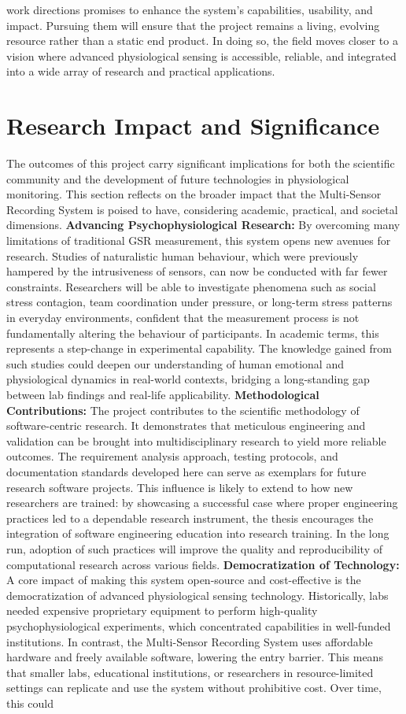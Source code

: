 \documentclass[11pt,a4paper]{report}
\begin{document}
{work directions promises to enhance the system’s capabilities, usability, and impact. Pursuing them will ensure that the project remains a living, evolving resource rather than a static end product. In doing so, the field moves closer to a vision where advanced physiological sensing is accessible, reliable, and integrated into a wide array of research and practical applications. \section{Research Impact and Significance}
The outcomes of this project carry significant implications for both the scientific community and the development of future technologies in physiological monitoring. This section reflects on the broader impact that the Multi-Sensor Recording System is poised to have, considering academic, practical, and societal dimensions. \textbf{Advancing Psychophysiological Research:} By overcoming many limitations of traditional GSR measurement, this system opens new avenues for research. Studies of naturalistic human behaviour, which were previously hampered by the intrusiveness of sensors, can now be conducted with far fewer constraints. Researchers will be able to investigate phenomena such as social stress contagion, team coordination under pressure, or long-term stress patterns in everyday environments, confident that the measurement process is not fundamentally altering the behaviour of participants. In academic terms, this represents a step-change in experimental capability. The knowledge gained from such studies could deepen our understanding of human emotional and physiological dynamics in real-world contexts, bridging a long-standing gap between lab findings and real-life applicability. \textbf{Methodological Contributions:} The project contributes to the scientific methodology of software-centric research. It demonstrates that meticulous engineering and validation can be brought into multidisciplinary research to yield more reliable outcomes. The requirement analysis approach, testing protocols, and documentation standards developed here can serve as exemplars for future research software projects. This influence is likely to extend to how new researchers are trained: by showcasing a successful case where proper engineering practices led to a dependable research instrument, the thesis encourages the integration of software engineering education into research training. In the long run, adoption of such practices will improve the quality and reproducibility of computational research across various fields. \textbf{Democratization of Technology:} A core impact of making this system open-source and cost-effective is the democratization of advanced physiological sensing technology. Historically, labs needed expensive proprietary equipment to perform high-quality psychophysiological experiments, which concentrated capabilities in well-funded institutions. In contrast, the Multi-Sensor Recording System uses affordable hardware and freely available software, lowering the entry barrier. This means that smaller labs, educational institutions, or researchers in resource-limited settings can replicate and use the system without prohibitive cost. Over time, this could }
\end{document}
